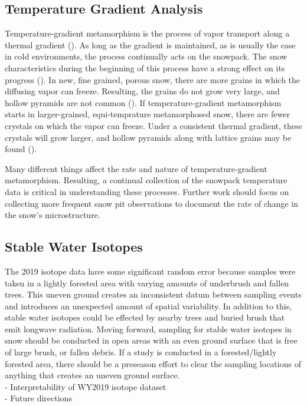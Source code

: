 \subsection{Temperature Gradient Analysis}
Temperature-gradient metamorphism is the process of vapor transport along a thermal gradient (\cite{sommerfeld_1970}). As long as the gradient is maintained, as is usually the case in cold environments, the process continually acts on the snowpack. The snow characteristics during the beginning of this process have a strong effect on its progress (\cite{sommerfeld_1970}). In new, fine grained, porous snow, there are more grains in which the diffusing vapor can freeze. Resulting, the grains do not grow very large, and hollow pyramids are not common (\cite{sommerfeld_1970}). If temperature-gradient metamorphism starts in larger-grained, equi-temprature metamorphosed snow, there are fewer crystals on which the vapor can freeze. Under a consistent thermal gradient, these crystals will grow larger, and hollow pyramids along with lattice grains may be found (\cite{akitaya_1967}). 

Many different things affect the rate and nature of temperature-gradient metamorphism. Resulting, a continual collection of the snowpack temperature data is critical in understanding these processes. Further work should focus on collecting more frequent snow pit observations to document the rate of change in the snow's microstructure. 

\subsection{Stable Water Isotopes}
The 2019 isotope data have some significant random error because samples were taken in a lightly forested area with varying amounts of underbrush and fallen trees. This uneven ground creates an inconsistent datum between sampling events and introduces an unexpected amount of spatial variability. In addition to this, stable water isotopes could be effected by nearby trees and buried brush that emit longwave radiation. Moving forward, sampling for stable water isotopes in snow should be conducted in open areas with an even ground surface that is free of large brush, or fallen debris. If a study is conducted in a forested/lightly forested area, there should be a preseason effort to clear the sampling locations of anything that creates an uneven ground surface. \\

- Interpretability of WY2019 isotope dataset \\
- Future directions  \\

